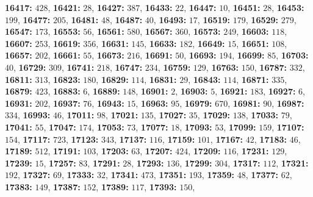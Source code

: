 \textsf{\bfseries 16417:} $428$, \textsf{\bfseries 16421:} $28$, \textsf{\bfseries 16427:} $387$, \textsf{\bfseries 16433:} $22$, \textsf{\bfseries 16447:} $10$, \textsf{\bfseries 16451:} $28$, \textsf{\bfseries 16453:} $199$, \textsf{\bfseries 16477:} $205$, \textsf{\bfseries 16481:} $48$, \textsf{\bfseries 16487:} $40$, \textsf{\bfseries 16493:} $17$, \textsf{\bfseries 16519:} $179$, \textsf{\bfseries 16529:} $279$, \textsf{\bfseries 16547:} $173$, \textsf{\bfseries 16553:} $56$, \textsf{\bfseries 16561:} $580$, \textsf{\bfseries 16567:} $360$, \textsf{\bfseries 16573:} $249$, \textsf{\bfseries 16603:} $118$, \textsf{\bfseries 16607:} $253$, \textsf{\bfseries 16619:} $356$, \textsf{\bfseries 16631:} $145$, \textsf{\bfseries 16633:} $182$, \textsf{\bfseries 16649:} $15$, \textsf{\bfseries 16651:} $108$, \textsf{\bfseries 16657:} $202$, \textsf{\bfseries 16661:} $55$, \textsf{\bfseries 16673:} $216$, \textsf{\bfseries 16691:} $50$, \textsf{\bfseries 16693:} $194$, \textsf{\bfseries 16699:} $85$, \textsf{\bfseries 16703:} $40$, \textsf{\bfseries 16729:} $309$, \textsf{\bfseries 16741:} $218$, \textsf{\bfseries 16747:} $234$, \textsf{\bfseries 16759:} $129$, \textsf{\bfseries 16763:} $150$, \textsf{\bfseries 16787:} $332$, \textsf{\bfseries 16811:} $313$, \textsf{\bfseries 16823:} $180$, \textsf{\bfseries 16829:} $114$, \textsf{\bfseries 16831:} $29$, \textsf{\bfseries 16843:} $114$, \textsf{\bfseries 16871:} $335$, \textsf{\bfseries 16879:} $423$, \textsf{\bfseries 16883:} $6$, \textsf{\bfseries 16889:} $148$, \textsf{\bfseries 16901:} $2$, \textsf{\bfseries 16903:} $5$, \textsf{\bfseries 16921:} $183$, \textsf{\bfseries 16927:} $6$, \textsf{\bfseries 16931:} $202$, \textsf{\bfseries 16937:} $76$, \textsf{\bfseries 16943:} $15$, \textsf{\bfseries 16963:} $95$, \textsf{\bfseries 16979:} $670$, \textsf{\bfseries 16981:} $90$, \textsf{\bfseries 16987:} $334$, \textsf{\bfseries 16993:} $46$, \textsf{\bfseries 17011:} $98$, \textsf{\bfseries 17021:} $135$, \textsf{\bfseries 17027:} $35$, \textsf{\bfseries 17029:} $138$, \textsf{\bfseries 17033:} $79$, \textsf{\bfseries 17041:} $55$, \textsf{\bfseries 17047:} $174$, \textsf{\bfseries 17053:} $73$, \textsf{\bfseries 17077:} $18$, \textsf{\bfseries 17093:} $53$, \textsf{\bfseries 17099:} $159$, \textsf{\bfseries 17107:} $154$, \textsf{\bfseries 17117:} $723$, \textsf{\bfseries 17123:} $343$, \textsf{\bfseries 17137:} $116$, \textsf{\bfseries 17159:} $101$, \textsf{\bfseries 17167:} $42$, \textsf{\bfseries 17183:} $46$, \textsf{\bfseries 17189:} $512$, \textsf{\bfseries 17191:} $103$, \textsf{\bfseries 17203:} $63$, \textsf{\bfseries 17207:} $424$, \textsf{\bfseries 17209:} $116$, \textsf{\bfseries 17231:} $129$, \textsf{\bfseries 17239:} $15$, \textsf{\bfseries 17257:} $83$, \textsf{\bfseries 17291:} $28$, \textsf{\bfseries 17293:} $136$, \textsf{\bfseries 17299:} $304$, \textsf{\bfseries 17317:} $112$, \textsf{\bfseries 17321:} $192$, \textsf{\bfseries 17327:} $69$, \textsf{\bfseries 17333:} $32$, \textsf{\bfseries 17341:} $473$, \textsf{\bfseries 17351:} $193$, \textsf{\bfseries 17359:} $48$, \textsf{\bfseries 17377:} $62$, \textsf{\bfseries 17383:} $149$, \textsf{\bfseries 17387:} $152$, \textsf{\bfseries 17389:} $117$, \textsf{\bfseries 17393:} $150$, 
